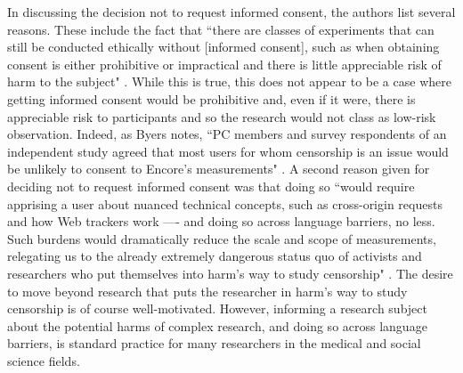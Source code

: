 \documentclass{svjour3}                     %
\begin{document}
In discussing the decision not to request informed consent, the authors list several reasons.  These include the fact that ``there are classes of experiments that can still be conducted ethically without [informed consent], such as when obtaining consent is either prohibitive or impractical and there is little appreciable risk of harm to the subject" \cite[p.~664]{burnett2015encore}. While this is true, this does not appear to be a case where getting informed consent would be prohibitive and, even if it were, there is appreciable risk to participants and so the research would not class as low-risk observation.  Indeed, as Byers notes, ``PC members and survey respondents of an independent study agreed that most users for whom censorship is an issue would be unlikely to consent to Encore's measurements" \cite{byers2015encore}. A second reason given for deciding not to request informed consent was that doing so ``would require apprising a user about nuanced technical concepts, such as cross-origin requests and how Web trackers work —- and doing so across language barriers, no less. Such burdens would dramatically reduce the scale and scope of measurements, relegating us to the already extremely dangerous status quo of activists and researchers who put themselves into harm’s way to study censorship" \cite[p.~664]{burnett2015encore}. The desire to move beyond research that puts the researcher in harm’s way to study censorship is of course well-motivated.  However, informing a research subject about the potential harms of complex research, and doing so across language barriers, is standard practice for many researchers in the medical and social science fields.
\end{document}
